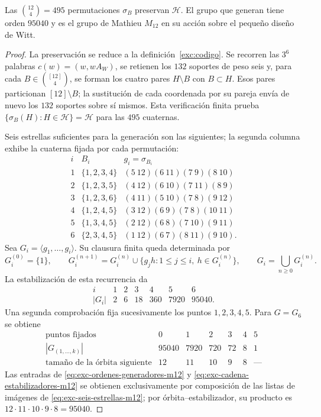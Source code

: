 \begin{proposition}
\label{exc:m12}
Las $\binom{12}4=495$ permutaciones $\sigma_B$ preservan $\mathcal H$.
El grupo que generan tiene orden $95040$ y es el grupo de Mathieu
$M_{12}$ en su acción sobre el pequeño diseño de Witt.
\end{proposition}

\begin{proof}
La preservación se reduce a la definición~\ref{exc:codigo}. Se recorren las
$3^6$ palabras $c(w)=(w,wA_W)$, se retienen los $132$ soportes de peso seis
y, para cada $B\in\binom{[12]}4$, se forman los cuatro pares
$H\setminus B$ con $B\subset H$. Esos pares particionan
$[12]\setminus B$; la sustitución de cada coordenada por su pareja envía
de nuevo los $132$ soportes sobre sí mismos. Esta verificación finita prueba
\(\{\sigma_B(H):H\in\mathcal H\}=\mathcal H\) para las $495$ cuaternas.

Seis estrellas suficientes para la generación son las siguientes; la
segunda columna exhibe la cuaterna fijada por cada permutación:
\[
\begin{array}{c|c|l}
i&B_i&g_i=\sigma_{B_i}\\ \hline
1&\{1,2,3,4\}&(5\ 12)(6\ 11)(7\ 9)(8\ 10)\\
2&\{1,2,3,5\}&(4\ 12)(6\ 10)(7\ 11)(8\ 9)\\
3&\{1,2,3,6\}&(4\ 11)(5\ 10)(7\ 8)(9\ 12)\\
4&\{1,2,4,5\}&(3\ 12)(6\ 9)(7\ 8)(10\ 11)\\
5&\{1,3,4,5\}&(2\ 12)(6\ 8)(7\ 10)(9\ 11)\\
6&\{2,3,4,5\}&(1\ 12)(6\ 7)(8\ 11)(9\ 10).
\end{array}
\tag{M12.1}
\label{eq:exc-seis-estrellas-m12}
\]
Sea $G_i=\langle g_1,\ldots,g_i\rangle$. Su clausura finita queda
determinada por
\[
 G_i^{(0)}=\{1\},\qquad
 G_i^{(n+1)}=G_i^{(n)}\cup
 \{g_jh:1\leq j\leq i,\ h\in G_i^{(n)}\},\qquad
 G_i=\bigcup_{n\geq0}G_i^{(n)}.
\tag{M12.2}
\label{eq:exc-clausura-finita-m12}
\]
La estabilización de esta recurrencia da
\[
\begin{array}{c|rrrrrr}
i&1&2&3&4&5&6\\ \hline
|G_i|&2&6&18&360&7920&95040.
\end{array}
\tag{M12.3}
\label{eq:exc-ordenes-generadores-m12}
\]
Una segunda comprobación fija sucesivamente los puntos $1,2,3,4,5$. Para
$G=G_6$ se obtiene
\[
\begin{array}{c|rrrrrr}
\text{puntos fijados}&0&1&2&3&4&5\\ \hline
|G_{(1,\ldots,k)}|&95040&7920&720&72&8&1\\
\text{tamaño de la órbita siguiente}&12&11&10&9&8&\text{---}
\end{array}
\tag{M12.4}
\label{eq:exc-cadena-estabilizadores-m12}
\]
Las entradas de \eqref{eq:exc-ordenes-generadores-m12} y
\eqref{eq:exc-cadena-estabilizadores-m12} se obtienen exclusivamente por
composición de las listas de imágenes de
\eqref{eq:exc-seis-estrellas-m12}; por órbita--estabilizador, su producto
es $12\cdot11\cdot10\cdot9\cdot8=95040$.


\end{proof}
